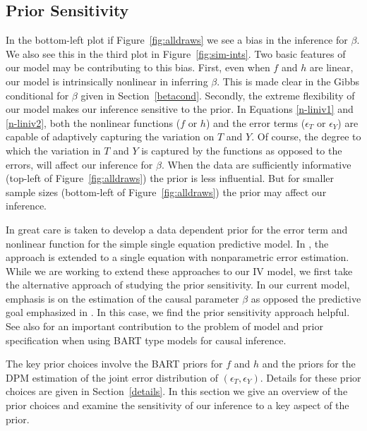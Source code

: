 \subsection{Prior Sensitivity}\label{subsec:sim-prisens}

In the bottom-left plot if Figure~\ref{fig:alldraws} we see a bias in the inference for $\beta$.
We also see this in the third plot in Figure~\ref{fig:sim-ints}.
Two basic features of our model may be contributing to this bias.
First, even when $f$ and $h$ are linear, our model is intrinsically nonlinear in inferring $\beta$.
This is made clear in the Gibbs conditional for $\beta$ given in Section~\ref{betacond}.
Secondly, the extreme flexibility of our model makes our inference sensitive to the prior.
In Equations \ref{n-liniv1} and \ref{n-liniv2}, both the nonlinear functions ($f$ or $h$) and
the error terms ($\epsilon_T$ or $\epsilon_Y$) are capable of adaptively capturing the variation on
$T$ and $Y$.
Of course, the degree to which the variation in $T$ and $Y$ is captured by the functions as opposed to
the errors, will affect our inference for $\beta$.
When the data are sufficiently informative (top-left of Figure~\ref{fig:alldraws}) the prior is less
influential.  But for smaller sample sizes (bottom-left of Figure~\ref{fig:alldraws}) the prior may affect
our inference.

In \citep{ChipGeor10} great care is taken to develop a data dependent prior for the error term
and nonlinear function for the simple single equation predictive model.
In \citep{DPMBART}, the approach is extended to a single equation with nonparametric error estimation.
While we are working to extend these approaches to our IV model, we first take the alternative approach
of studying the prior sensitivity.
In our current model, emphasis is on the estimation of the causal parameter $\beta$
as opposed the predictive goal emphasized in \citep{ChipGeor10}.
In this case, we find the prior sensitivity approach helpful.
See also \citep{BCF} for  an important contribution to the problem of model and prior specification when
using BART type models for causal inference.

The key prior choices involve the BART priors for $f$ and $h$ and the priors for the DPM estimation
of the joint error distribution of $(\epsilon_T,\epsilon_Y)$.
Details for these prior choices are given in Section~\ref{details}.
In this section we give an overview of the prior choices and examine the sensitivity of our
inference to a key aspect of the prior.


